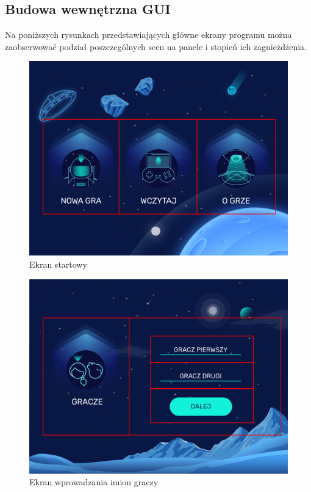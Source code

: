 \documentclass[a4paper]{article}
\begin{document}
\subsection{Budowa wewnętrzna GUI}
Na poniższych rysunkach przedstawiających główne ekrany programu można zaobserwować podział poszczególnych scen na panele i stopień ich zagnieżdżenia.
\begin{figure}[H]
    \centering
    \includegraphics[width=1\textwidth]{img/ekran-start-grid.png}
    \caption{Ekran startowy}
    \label{fig:start}
\end{figure}

\begin{figure}[H]
    \centering
    \includegraphics[width=1\textwidth]{img/ekran-gracze-grid.png}
    \caption{Ekran wprowadzania imion graczy}
    \label{fig:gracze}
\end{figure}
\end{document}
